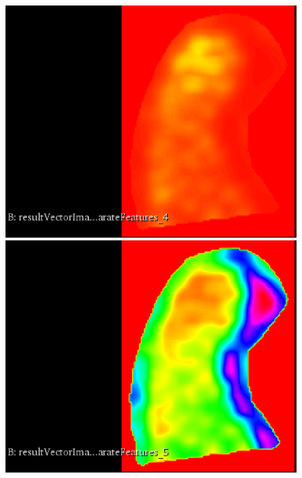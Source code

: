 \documentclass{InsightArticle}
\begin{document}
\begin{figure}[H]
  \begin{center}
    \includegraphics[scale=0.3]{figures/LowGreyLevelRunEmphasis.eps}
    \includegraphics[scale=0.3]{figures/HighGreyLevelRunEmphasis.eps}

\end{center}
\end{figure}
\end{document}
